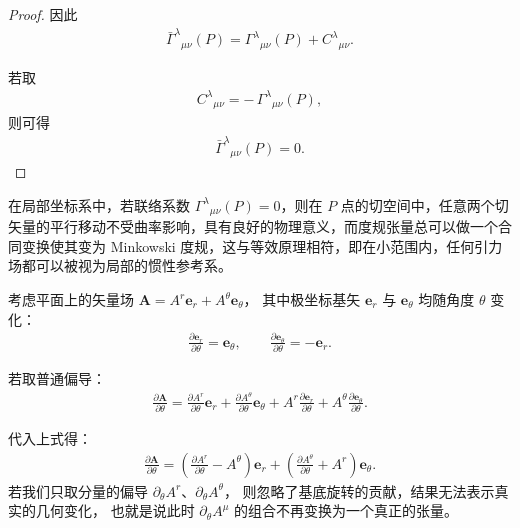 \begin{proof}
因此
\begin{align}
\bar{\Gamma}^{\lambda}{}_{\mu \nu}(P)
= \Gamma^{\lambda}{}_{\mu \nu}(P)
  + C^{\lambda}{}_{\mu \nu}.
\end{align}

若取
\begin{align}
C^{\lambda}{}_{\mu \nu} = -\,\Gamma^{\lambda}{}_{\mu \nu}(P),
\end{align}
则可得
\begin{align}
\boxed{\bar{\Gamma}^{\lambda}{}_{\mu \nu}(P) = 0.}
\end{align}

\end{proof}

\begin{derivationnote}[零联络坐标定理和等效原理]
在局部坐标系中，若联络系数 $\Gamma^{\lambda}{}_{\mu\nu}(P) = 0$，则在 $P$ 点的切空间中，任意两个切矢量的平行移动不受曲率影响，具有良好的物理意义，而度规张量总可以做一个合同变换使其变为 Minkowski 度规，这与等效原理相符，即在小范围内，任何引力场都可以被视为局部的惯性参考系。
\end{derivationnote}

\begin{example}[极坐标]
考虑平面上的矢量场 $\mathbf{A} = A^r \mathbf{e}_r + A^\theta \mathbf{e}_\theta$，  
其中极坐标基矢 $\mathbf{e}_r$ 与 $\mathbf{e}_\theta$ 均随角度 $\theta$ 变化：
\begin{align}
\frac{\partial \mathbf{e}_r}{\partial \theta} = \mathbf{e}_\theta, 
\qquad
\frac{\partial \mathbf{e}_\theta}{\partial \theta} = -\mathbf{e}_r.
\end{align}

若取普通偏导：
\begin{align}
\frac{\partial \mathbf{A}}{\partial \theta}
= \frac{\partial A^r}{\partial \theta} \mathbf{e}_r
+ \frac{\partial A^\theta}{\partial \theta} \mathbf{e}_\theta
+ A^r \frac{\partial \mathbf{e}_r}{\partial \theta}
+ A^\theta \frac{\partial \mathbf{e}_\theta}{\partial \theta}.
\end{align}

代入上式得：
\begin{align}
\frac{\partial \mathbf{A}}{\partial \theta}
= \left( \frac{\partial A^r}{\partial \theta} - A^\theta \right) \mathbf{e}_r
+ \left( \frac{\partial A^\theta}{\partial \theta} + A^r \right) \mathbf{e}_\theta.
\end{align}
若我们只取分量的偏导 $\partial_\theta A^r$、$\partial_\theta A^\theta$，
则忽略了基底旋转的贡献，结果无法表示真实的几何变化，
也就是说此时 $\partial_\theta A^\mu$ 的组合不再变换为一个真正的张量。
\end{example}

